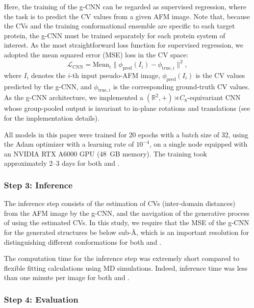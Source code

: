 Here, the training of the g-CNN can be regarded as supervised regression, where the task is to predict the CV values from a given AFM image.
Note that, because the CVs and the training conformational ensemble are specific to each target protein, the g-CNN must be trained separately for each protein system of interest.
As the most straightforward loss function for supervised regression, we adopted the mean squared error (MSE) loss in the CV space:
\begin{equation}
    \mathcal{L}_{\text{CNN}} = \mathrm{Mean}_{i} \| \phi_{\text{pred}}(I_i) - \phi_{\text{true}, i} \|^2,
    \label{eq:cnn-mse-loss}
\end{equation}
where $I_i$ denotes the $i$-th input pseudo-AFM image, $\phi_{\text{pred}}(I_i)$ is the CV values predicted by the g-CNN, and $\phi_{\text{true}, i}$ is the corresponding ground-truth CV values. As the g-CNN architecture, we implemented a $(\mathbb{R}^2, +) \rtimes C_8$-equivariant CNN whose group-pooled output is invariant to in-plane rotations and translations (see  for the implementation details).

All models in this paper were trained for 20 epochs with a batch size of 32, using the Adam optimizer with a learning rate of $10^{-4}$, on a single node equipped with an NVIDIA RTX A6000 GPU (48~GB memory). 
The training took approximately 2--3 days for both \AK and \flhac.

\subsubsection{Step 3: Inference}

The inference step consists of the estimation of CVs (inter-domain distances) from the AFM image by the g-CNN, and the navigation of the generative process of \AFiii using the estimated CVs. 
In this study, we require that the MSE of the g-CNN for the generated structures be below sub-\AA{}, 
which is an important resolution for distinguishing different conformations for both \AK and \flhac. 

The computation time for the inference step was extremely short 
compared to flexible fitting calculations using MD simulations. 
Indeed, inference time was less than one minute per image for both \AK and \flhac.

\subsubsection{Step 4: Evaluation}
\label{subsubsec:evaluation}

